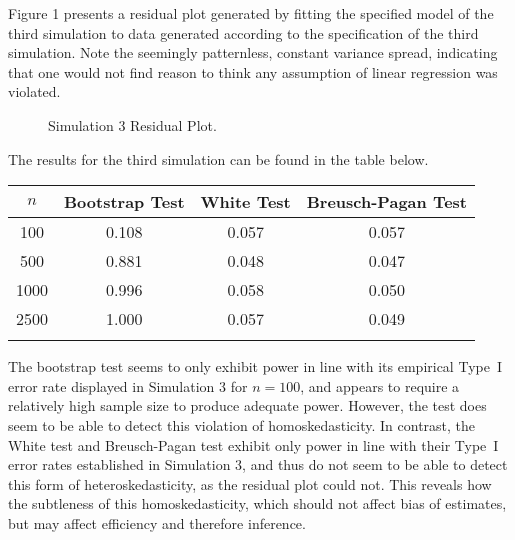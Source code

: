 \documentclass[12pt]{article} %
\theoremstyle{definition}
\begin{document}
Figure 1 presents a residual plot generated by fitting the specified model of the third simulation to data generated according to the specification of the third simulation. Note the seemingly
patternless, constant variance spread, indicating that one would not find reason to think any assumption of linear regression was violated. 

\begin{figure}[H]
\centerline{}\par  %
\caption{Simulation 3 Residual Plot.}
\end{figure}

The results for the third simulation can be found in the table below.

\begin{table}[H]
	\centering
	\small\addtolength{\tabcolsep}{-3pt}
	\setlength\extrarowheight{-3pt}
	{
	\begin{tabular}{ c|c|c|c}
	$n$ & Bootstrap Test & White Test & Breusch-Pagan Test \\
	 \hline
	 100 & 0.108 & 0.057 & 0.057 \\
	 500 & 0.881 & 0.048 & 0.047 \\
	 1000 & 0.996 & 0.058 & 0.050 \\
	 2500 & 1.000 & 0.057 & 0.049 \\
	 \Xhline{3\arrayrulewidth}
	\end{tabular}
	}
\end{table}

The bootstrap test seems to only exhibit power in line with its empirical Type~I error rate displayed in Simulation 3 for $n = 100$, and appears to require a relatively high sample size to produce
adequate power. However, the test does seem to be able to detect this violation of homoskedasticity. In contrast, the White test and Breusch-Pagan test exhibit only power in line with their Type~I error
rates established in Simulation 3, and thus do not seem to be able to detect this form of heteroskedasticity, as the residual plot could not. This reveals how the subtleness of this homoskedasticity,
which should not affect bias of estimates, but may affect efficiency and therefore inference.
\end{document}
